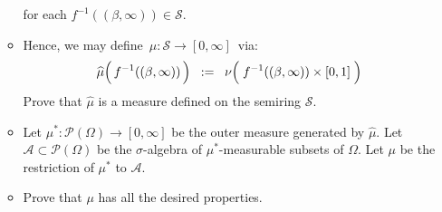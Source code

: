 \begin{itemize}
\begin{itemize}
		for each $f^{-1}((\beta,\infty)) \in \mathcal{S}$.
		\vskip 0.05cm
	\item
		Hence, we may define \,$\widehat{\mu} : \mathcal{S} \longrightarrow [0,\infty]$\, via:
		\begin{equation*}
		\widehat{\mu}\!\left(\,f^{-1}((\beta,\overset{{\color{white}-}}{\infty}))\,\right)
		\;\; := \;\;
			\nu\!\left(\; f^{-1}((\beta,\overset{{\color{white}-}}{\infty})) \times [0,1] \;\right)			
		\end{equation*}
		Prove that $\widehat{\mu}$ is a measure defined on the semiring $\mathcal{S}$.
	\item
		Let $\mu^{*} : \mathcal{P}(\Omega) \longrightarrow [0,\infty]$ be the outer measure generated by $\widehat{\mu}$.
		\vskip 0.05cm
		Let $\mathcal{A} \subset \mathcal{P}(\Omega)$ be the $\sigma$-algebra of $\mu^{*}$-measurable
		subsets of $\Omega$.
		\vskip 0.05cm
		Let $\mu$ be the restriction of $\mu^{*}$ to $\mathcal{A}$.
	\item
		Prove that $\mu$ has all the desired properties.
	\end{itemize}
\end{itemize}


\renewcommand{\theenumi}{\roman{enumi}}
\renewcommand{\labelenumi}{\textnormal{(\theenumi)}$\;\;$}

